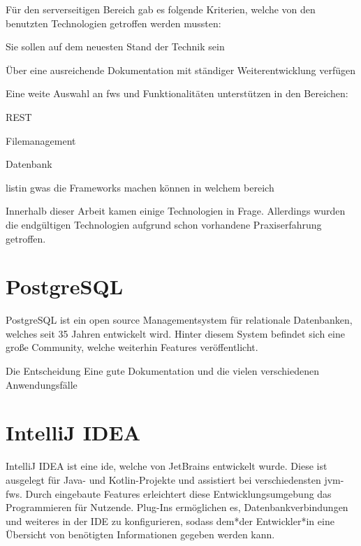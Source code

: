 Für den serverseitigen Bereich gab es folgende Kriterien, welche von den benutzten Technologien getroffen werden mussten:
\begin{compactitem}
    \item Sie sollen auf dem neuesten Stand der Technik sein
    \item Über eine ausreichende Dokumentation mit ständiger Weiterentwicklung verfügen
    \item Eine weite Auswahl an \glspl{fw} und Funktionalitäten unterstützen in den Bereichen:
    \begin{compactitem}
        \item REST
        \item Filemanagement
        \item Datenbank
    \end{compactitem}
\end{compactitem} 
listin gwas die Frameworks machen können in welchem bereich

Innerhalb dieser Arbeit kamen einige Technologien in Frage. 
Allerdings wurden die endgültigen Technologien aufgrund schon vorhandene Praxiserfahrung getroffen. 



\section{PostgreSQL}
PostgreSQL ist ein open source Managementsystem für relationale Datenbanken, welches seit 35 Jahren entwickelt wird. 
Hinter diesem System befindet sich eine große Community, welche weiterhin Features veröffentlicht. 

Die Entscheidung  Eine gute Dokumentation und die vielen verschiedenen Anwendungsfälle 
\cite{PostgreSQLAbout}


\section{IntelliJ IDEA}
IntelliJ IDEA ist eine \gls{ide}, welche von JetBrains entwickelt wurde. 
Diese ist ausgelegt für Java- und Kotlin-Projekte und assistiert bei verschiedensten \gls{jvm}-\glspl{fw}. 
Durch eingebaute Features erleichtert diese Entwicklungsumgebung das Programmieren für Nutzende. 
Plug-Ins ermöglichen es, Datenbankverbindungen und weiteres in der IDE zu konfigurieren, sodass dem*der Entwickler*in eine Übersicht von benötigten Informationen gegeben werden kann.
\cite{IntelliJIDEA}

